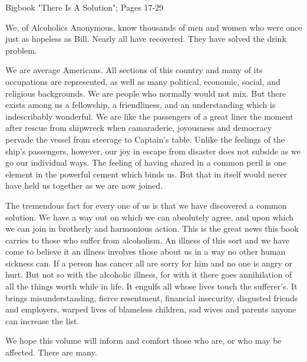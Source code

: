 

Bigbook "There Is A Solution"; Pages 17-29


\begin{biblechapter}
    We, of Alcoholics Anonymous, 
    know thousands of men and women who were once just as hopeless as Bill. 
\verse Nearly all have recovered. 
\verse They have solved the drink problem.

    We are average Americans. 
\verse All sections of this country 
    and many of its occupations are represented, 
    as well as many political, economic, social, 
    and religious backgrounds. 
\verse We are people who normally would not mix. 
\verse But there exists among us a fellowship, 
    a friendliness, 
    and an understanding which is indescribably wonderful. 
\verse We are like the passengers of a great liner 
    the moment after rescue from shipwreck when 
    camaraderie, joyousness and democracy pervade the vessel 
    from steerage to Captain's table. 
\verse Unlike the feelings of the ship's passengers, however, 
    our joy in escape from disaster does not subside 
    as we go our individual ways. 
\verse The feeling of having shared in a common peril is one element 
    in the powerful cement which binds us. 
\verse But that in itself would never have held us together 
    as we are now joined.

    The tremendous fact for every one of us is 
    that we have discovered a common solution. 
\verse We have a way out on which we can absolutely agree, 
    and upon which we can join in brotherly and harmonious action. 
\verse This is the great news this book carries 
    to those who suffer from alcoholism. 
\verse An illness of this sort 
    and we have come to believe it an illness 
    involves those about us in a way no other human sickness can. 
\verse If a person has cancer all are sorry for him 
    and no one is angry or hurt. 
\verse But not so with the alcoholic illness, 
    for with it there goes annihilation 
    of all the things worth while in life. 
\verse It engulfs all whose lives touch the sufferer's. 
\verse It brings misunderstanding, 
    fierce resentment, 
    financial insecurity, 
    disgusted friends and employers, 
    warped lives of blameless children, 
    sad wives and parents anyone can increase the list.

\verse We hope this volume will inform and comfort those who are, 
    or who may be affected. 
\verse There are many.
\end{biblechapter}


